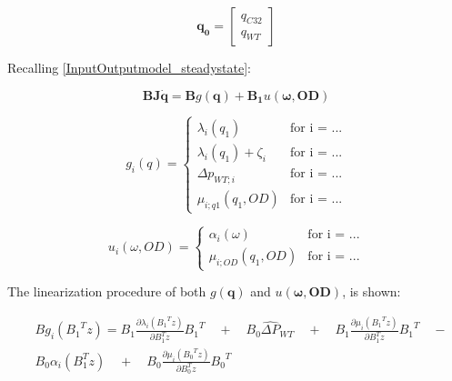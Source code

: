 \begin{equation}
\pmb{q_0} =
\begin{bmatrix}
         q_{C32} \\
	q_{WT}
\end{bmatrix}
\label{qvector}
\end{equation}

Recalling \eqref{InputOutputmodel_steadystate}:

\begin{equation}
 \pmb{B}\pmb{J} \pmb{\dot{q}} = \pmb{B} g(\pmb{q})+ \pmb{B_1} u(\pmb{\omega},\pmb{OD})
 \label{InputOutputmodel_steadystate_linmodel}
\end{equation}

\begin{equation}
\label{gfunction}
 g_{i}(q) =
		\left\{
		\begin{array}{ll}
		
		\lambda_i(q_1) 			&      \text{for i = ...}	
\\
		\lambda_i(q_1) + \zeta_i                      &     \text{for i = ...}
\\

                \Delta p_{WT;i}                       &      \text{for i = ...}
\\

                \mu_{i;q1}(q_1, OD)                       &      \text{for i = ...}

		\end{array}
		\right.
\end{equation}	

\begin{equation}
\label{ufunction}
 u_{i}(\omega, OD) =
		\left\{
		\begin{array}{ll}
		
		\alpha_i(\omega) 			&      \text{for i = ...}	
\\
		\mu_{i;OD}(q_1, OD)                      &     \text{for i = ...}

		\end{array}
		\right.
\end{equation}	

The linearization procedure of both $g(\pmb{q})$ and $u(\pmb{\omega},\pmb{OD})$, is shown:

\begin{equation}
  \begin{split}
  & B g_{i}({B_{1}}^{T}z) = B_1 \frac{\partial{\lambda_{i}({{B_{1}}^{T}z})}}{\partial{B_{1}^{T}z}} {B_1}^{T} \quad + \quad
  B_0 {\hat{\Delta P}}_{WT} \quad + \quad B_1 \frac{\partial{\mu_{i}({{B_{1}}^{T}z})}}{\partial{B_{1}^{T}z}} {B_1}^{T} \quad - \\
  &  B_0 \alpha_{i}(B_{1}^{T}z) \quad + \quad B_0 \frac{\partial{\mu_{i}({{B_{0}}^{T}z})}}{\partial{B_{0}^{T}z}} {B_0}^{T}
  \end{split}
  \label{StateLinear}
\end{equation}

